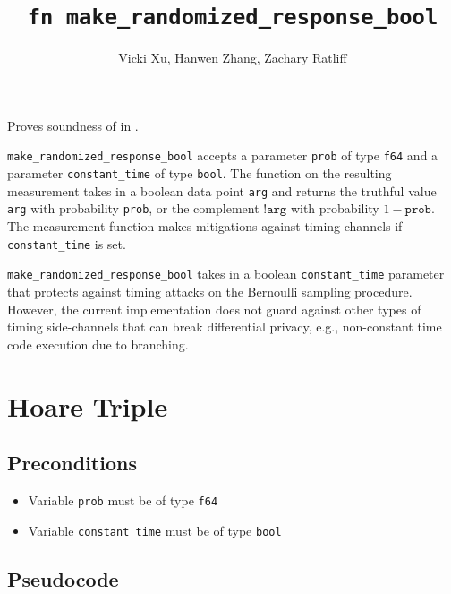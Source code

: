 \documentclass{article}
\title{\texttt{fn make\_randomized\_response\_bool}}
\author{Vicki Xu, Hanwen Zhang, Zachary Ratliff}
\begin{document}
\maketitle

\contrib

Proves soundness of  in .

\texttt{make\_randomized\_response\_bool} accepts a parameter \texttt{prob} of type \texttt{f64} and a parameter \texttt{constant\_time} of type \texttt{bool}.
The function on the resulting measurement takes in a boolean data point \texttt{arg} and returns the truthful value \texttt{arg} with probability \texttt{prob},
or the complement $\texttt{!arg}$ with probability $1 - \texttt{prob}$.
The measurement function makes mitigations against timing channels if \texttt{constant\_time} is set. 

\begin{tcolorbox}
    \begin{warning}
        \texttt{make\_randomized\_response\_bool} takes in a boolean \texttt{constant\_time} parameter that protects against timing attacks on the Bernoulli sampling procedure. 
        However, the current implementation does not guard against other types of timing side-channels that can break differential privacy, e.g., non-constant time code execution due to branching.
    \end{warning}
\end{tcolorbox}

\section{Hoare Triple}

\subsection*{Preconditions}
\begin{itemize}
    \item Variable \texttt{prob} must be of type \texttt{f64}
    \item Variable \texttt{constant\_time} must be of type \texttt{bool}
\end{itemize}

\subsection*{Pseudocode}

\end{document}
